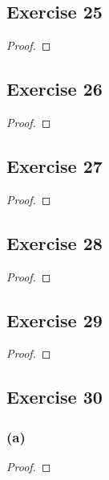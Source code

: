 \documentclass[14pt]{extarticle}
\begin{document}
\subsection{Exercise 25}

\begin{proof}

\end{proof}

\subsection{Exercise 26}

\begin{proof}

\end{proof}

\subsection{Exercise 27}

\begin{proof}

\end{proof}

\subsection{Exercise 28}

\begin{proof}

\end{proof}

\subsection{Exercise 29}

\begin{proof}

\end{proof}

\subsection{Exercise 30}

\subsubsection{(a)}

\begin{proof}

\end{proof}
\end{document}
